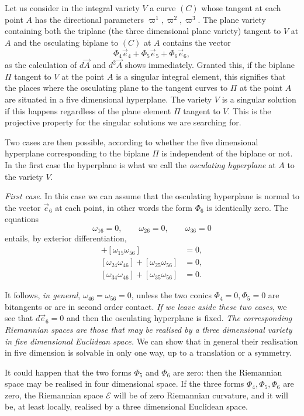 \documentclass[leqno,11pt]{book}
\numberwithin{equation}{chapter}
\theoremstyle{shape1}
\theoremstyle{shape0}
\theoremstyle{shape2}
\theoremstyle{definition}
\begin{document}
Let us consider in the integral variety $V$ a curve $(C)$ whose tangent at each point $A$ has the directional parameters $\varpi^{1},\varpi^{2},\varpi^{3}$. The plane variety containing both the triplane (the three dimensional plane variety) tangent to $V$ at $A$ and the osculating biplane to $(C)$ at $A$ contains the vector
\[
\Phi_{4}\vec e_{4}+\Phi_{5}\vec e_{5}+\Phi_{6}\vec e_{6},
\]
as the calculation of $d\vec A$ and $d^{2}\vec A$ shows immediately. Granted this, if the biplane $\Pi$ tangent to $V$ at the point $A$ is a singular integral element, this signifies that the places where the osculating plane to the tangent curves to $\Pi$ at the point $A$ are situated in a five dimensional hyperplane. The variety $V$ is a singular solution if this happens regardless of the plane element $\Pi$ tangent to $V$. This is the projective property for the singular solutions we are searching for.

Two cases are then possible, according to whether the five dimensional hyperplane corresponding to the biplane $\Pi$ is independent of the biplane or not. In the first case the hyperplane is what we call the \emph{osculating hyperplane} at $A$ to the variety $V$.

\emph{First case}. In this case we can assume that the osculating hyperplane is normal to the vector $\vec e_{6}$ at each point, in other words the form $\Phi_{6}$ is identically zero. The equations
\[
\omega_{16}=0,\qquad\omega_{26}=0,\qquad\omega_{36}=0
\]
entails, by exterior differentiation,
\begin{align*}
  [\omega_{14}\omega_{46}]+[\omega_{15}\omega_{56}]&=0,\\
  [\omega_{24}\omega_{46}]+[\omega_{25}\omega_{56}]&=0,\\
  [\omega_{34}\omega_{46}]+[\omega_{35}\omega_{56}]&=0.
\end{align*}

It follows, \emph{in general}, $\omega_{46}=\omega_{56}=0$, unless the two conics $\Phi_{4}=0,\Phi_{5}=0$ are bitangents or are in second order contact. \emph{If we leave aside these two cases}, we see that $d\vec e_{6}=0$ and then the osculating hyperplane is fixed. \emph{The corresponding Riemannian spaces are those that may be realised by a three dimensional variety in five dimensional Euclidean space.} We can show that in general their realisation in five dimension is solvable in only one way, up to a translation or a symmetry.

It could happen that the two forms $\Phi_{5}$ and $\Phi_{6}$ are zero: then the Riemannian space may be realised in four dimensional space. If the three forms $\Phi_{4},\Phi_{5},\Phi_{6}$ are zero, the Riemannian space $\mathcal{E}$ will be of zero Riemannian curvature, and it will be, at least locally, realised by a three dimensional Euclidean space.
\end{document}
